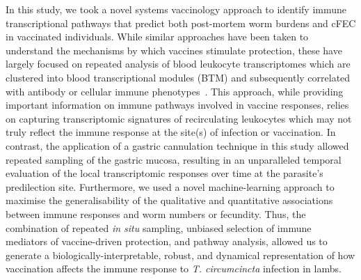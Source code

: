 \documentclass[a4paper, hidelinks, 11pt]{article}
\begin{document}
In this study, we took a novel systems vaccinology approach to identify immune
transcriptional pathways that predict both post-mortem worm burdens and cFEC in
vaccinated individuals. While similar approaches have been taken to understand
the mechanisms by which vaccines stimulate protection, these have largely
focused on repeated analysis of blood leukocyte transcriptomes which are
clustered into blood transcriptional modules (BTM) and subsequently correlated
with antibody or cellular immune phenotypes~\supercite{Li2014,Hou2017,
Braun2018}. This approach, while providing important information on immune
pathways involved in vaccine responses, relies on capturing transcriptomic
signatures of recirculating leukocytes which may not truly reflect the immune
response at the site(s) of infection or vaccination. In contrast, the
application of a gastric cannulation technique in this study allowed repeated
sampling of the gastric mucosa, resulting in an unparalleled temporal evaluation
of the local transcriptomic responses over time at the parasite's predilection
site.  Furthermore, we used a novel machine-learning approach to maximise the
generalisability of the qualitative and quantitative associations between immune
responses and worm numbers or fecundity. Thus, the combination of repeated
\emph{in situ} sampling, unbiased selection of immune mediators of
vaccine-driven protection, and pathway analysis, allowed us to generate a
biologically-interpretable, robust, and dynamical representation of how
vaccination affects the immune response to \emph{T. circumcincta} infection in
lambs.
\end{document}

